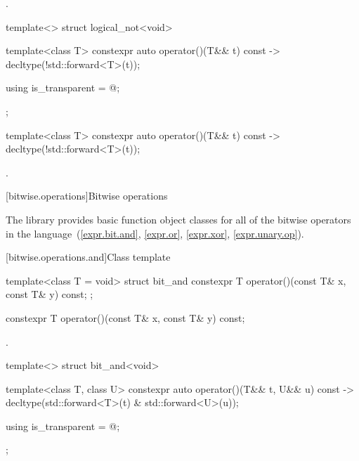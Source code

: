 \begin{itemdescr}
\pnum\returns {}.
\end{itemdescr}

%
\begin{itemdecl}
template<> struct logical_not<void> {
  template<class T> constexpr auto operator()(T&& t) const
    -> decltype(!std::forward<T>(t));

  using is_transparent = @\unspec@;
};
\end{itemdecl}

%
\begin{itemdecl}
template<class T> constexpr auto operator()(T&& t) const
    -> decltype(!std::forward<T>(t));
\end{itemdecl}

\begin{itemdescr}
\pnum\returns {}.
\end{itemdescr}


[bitwise.operations]{Bitwise operations}

\pnum
The library provides basic function object classes for all of the bitwise
operators in the language~(\ref{expr.bit.and}, \ref{expr.or},
\ref{expr.xor}, \ref{expr.unary.op}).

[bitwise.operations.and]{Class template }

%
\begin{itemdecl}
template<class T = void> struct bit_and {
  constexpr T operator()(const T& x, const T& y) const;
};
\end{itemdecl}

%
\begin{itemdecl}
constexpr T operator()(const T& x, const T& y) const;
\end{itemdecl}

\begin{itemdescr}
\pnum\returns {}.
\end{itemdescr}

%
\begin{itemdecl}
template<> struct bit_and<void> {
  template<class T, class U> constexpr auto operator()(T&& t, U&& u) const
    -> decltype(std::forward<T>(t) & std::forward<U>(u));

  using is_transparent = @\unspec@;
};
\end{itemdecl}

